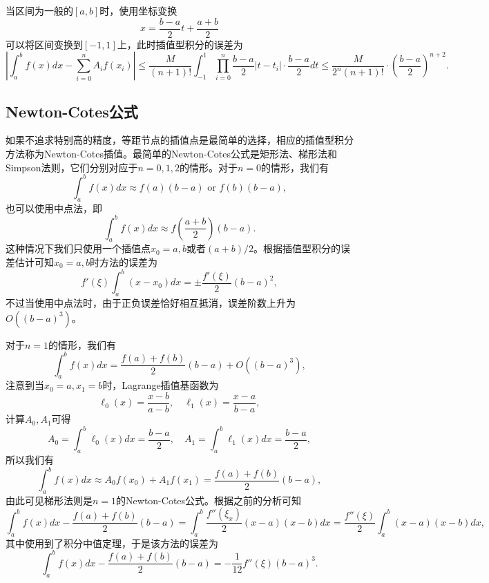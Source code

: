 \documentclass[a4paper,10pt]{ctexart}
\begin{document}
当区间为一般的$ [a,b] $时，使用坐标变换
\[
    x = \frac{b-a}{2}t + \frac{a+b}{2}
\]
可以将区间变换到$ [-1,1] $上，此时插值型积分的误差为
\begin{equation}
    \left\vert \int_a^b f(x)dx - \sum_{i=0}^n A_i f(x_i) \right\vert\leqslant \frac{M}{(n+1)!} \int_{-1}^1 \prod_{i=0}^n \frac{b-a}{2}\vert t-t_i \vert\cdot \frac{b-a}{2}dt \leqslant \frac{M}{2^{n}(n+1)!}\cdot (\frac{b-a}{2})^{n+2}.
\end{equation}

\subsection{Newton-Cotes公式}
如果不追求特别高的精度，等距节点的插值点是最简单的选择，相应的插值型积分方法称为Newton-Cotes插值。最简单的Newton-Cotes公式是矩形法、梯形法和Simpson法则，它们分别对应于$ n=0,1,2 $的情形。对于$ n=0 $的情形，我们有
\begin{equation}
    \int_a^b f(x)dx \approx f(a)(b-a) \text{ or } f(b)(b-a),
\end{equation}
也可以使用中点法，即
\begin{equation}
    \int_a^b f(x)dx \approx f(\frac{a+b}{2})(b-a).
\end{equation}
这种情况下我们只使用一个插值点$ x_0=a,b $或者$ (a+b) / 2 $。根据插值型积分的误差估计可知$ x_0=a,b $时方法的误差为
\[
    f'(\xi) \int_a^b (x-x_0) dx = \pm \frac{f'(\xi)}{2}(b-a)^2,
\]
不过当使用中点法时，由于正负误差恰好相互抵消，误差阶数上升为$ O((b-a)^3) $。

对于$ n=1 $的情形，我们有
\begin{equation}
    \int_a^b f(x)dx = \frac{f(a)+f(b)}{2}(b-a) + O((b-a)^3),
\end{equation}
注意到当$ x_0=a,x_1=b $时，Lagrange插值基函数为
\[
    \ell_0(x) = \frac{x-b}{a-b},\quad \ell_1(x) = \frac{x-a}{b-a},
\]
计算$ A_0,A_1 $可得
\[
    A_0 = \int_a^b \ell_0(x)dx = \frac{b-a}{2},\quad A_1 = \int_a^b \ell_1(x)dx = \frac{b-a}{2},
\]
所以我们有
\[
    \int_a^b f(x)dx \approx A_0 f(x_0) + A_1 f(x_1) =  \frac{f(a)+f(b)}{2}(b-a),
\]
由此可见梯形法则是$ n=1 $的Newton-Cotes公式。根据之前的分析可知
\[
    \int_a^b f(x)dx - \frac{f(a)+f(b)}{2}(b-a) = \int_a^b \frac{f''(\xi_x)}{2} (x-a)(x-b) dx = \frac{f''(\xi)}{2} \int_a^b (x-a)(x-b) dx,
\]
其中使用到了积分中值定理，于是该方法的误差为
\[
    \int_a^b f(x)dx - \frac{f(a)+f(b)}{2}(b-a) = -\frac{1}{12}f''(\xi)(b-a)^3.
\]
\end{document}
